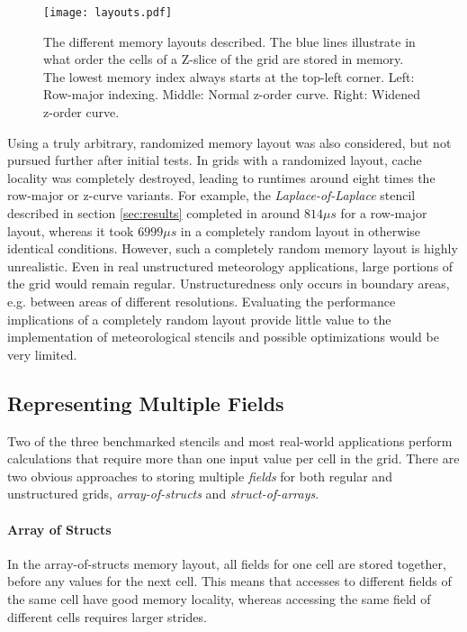 \begin{figure}
	\texttt{[image: layouts.pdf]}
	\caption{\label{fig:layouts} The different memory layouts described. The blue lines illustrate in what order the cells of a Z-slice of the grid are stored in memory. The lowest memory index always starts at the top-left corner. Left: Row-major indexing. Middle: Normal z-order curve. Right: Widened z-order curve.}
\end{figure}

Using a truly arbitrary, randomized memory layout was also considered, but not pursued further after initial tests. In grids with a randomized layout, cache locality was completely destroyed, leading to runtimes around eight times the row-major or z-curve variants. For example, the \emph{Laplace-of-Laplace} stencil described in section \ref{sec:results} completed in around $814 \mu s$ for a row-major layout, whereas it took $6999 \mu s$ in a completely random layout in otherwise identical conditions. However, such a completely random memory layout is highly unrealistic. Even in real unstructured meteorology applications, large portions of the grid would remain regular. Unstructuredness only occurs in boundary areas, e.g. between areas of different resolutions. Evaluating the performance implications of a completely random layout provide little value to the implementation of meteorological stencils and possible optimizations would be very limited.


\subsection{Representing Multiple Fields} \label{sec:representing-multiple-fields}

Two of the three benchmarked stencils and most real-world applications perform calculations that require more than one input value per cell in the grid. There are two obvious approaches to storing multiple \emph{fields} for both regular and unstructured grids, \emph{array-of-structs} and \emph{struct-of-arrays}.

\paragraph{Array of Structs}
In the array-of-structs memory layout, all fields for one cell are stored together, before any values for the next cell. This means that accesses to different fields of the same cell have good memory locality, whereas accessing the same field of different cells requires larger strides.

